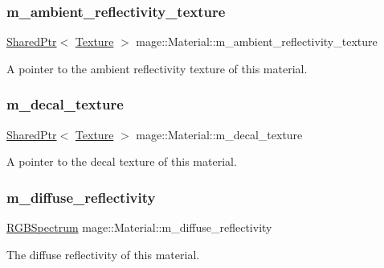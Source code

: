 \subsubsection{\texorpdfstring{m\+\_\+ambient\+\_\+reflectivity\+\_\+texture}{m\_ambient\_reflectivity\_texture}}
{\footnotesize\ttfamily \hyperlink{namespacemage_a1e01ae66713838a7a67d30e44c67703e}{Shared\+Ptr}$<$ \hyperlink{classmage_1_1_texture}{Texture} $>$ mage\+::\+Material\+::m\+\_\+ambient\+\_\+reflectivity\+\_\+texture}

A pointer to the ambient reflectivity texture of this material. \hypertarget{structmage_1_1_material_acdab45e5d78ddbb7f717d9db67ff3fcf}{}\label{structmage_1_1_material_acdab45e5d78ddbb7f717d9db67ff3fcf} 
\subsubsection{\texorpdfstring{m\+\_\+decal\+\_\+texture}{m\_decal\_texture}}
{\footnotesize\ttfamily \hyperlink{namespacemage_a1e01ae66713838a7a67d30e44c67703e}{Shared\+Ptr}$<$ \hyperlink{classmage_1_1_texture}{Texture} $>$ mage\+::\+Material\+::m\+\_\+decal\+\_\+texture}

A pointer to the decal texture of this material. \hypertarget{structmage_1_1_material_afd2cc813023698e52edc01b267a17e6c}{}\label{structmage_1_1_material_afd2cc813023698e52edc01b267a17e6c} 
\subsubsection{\texorpdfstring{m\+\_\+diffuse\+\_\+reflectivity}{m\_diffuse\_reflectivity}}
{\footnotesize\ttfamily \hyperlink{structmage_1_1_r_g_b_spectrum}{R\+G\+B\+Spectrum} mage\+::\+Material\+::m\+\_\+diffuse\+\_\+reflectivity}

The diffuse reflectivity of this material. \hypertarget{structmage_1_1_material_a5193e30d3875695c96526a85edc84b88}{}\label{structmage_1_1_material_a5193e30d3875695c96526a85edc84b88} 
